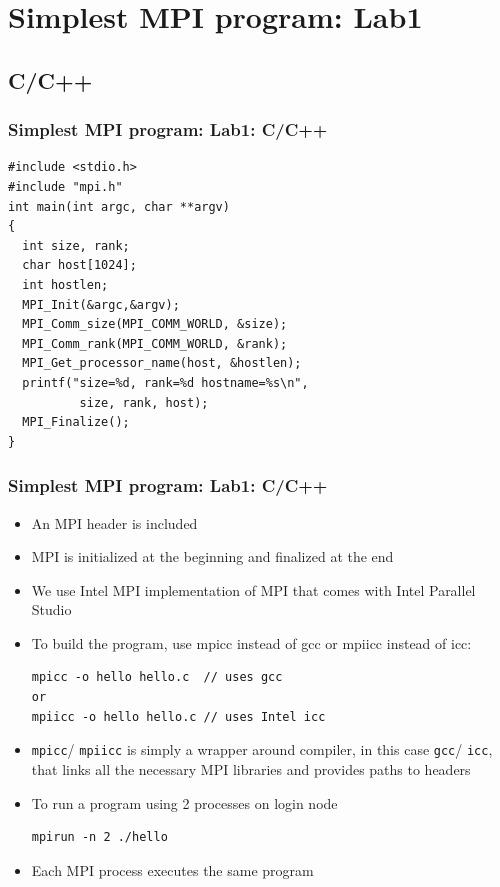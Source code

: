 \documentclass{beamer}
\begin{document}
\section{Simplest MPI program: Lab1}
\subsection{C/C++}
\begin{frame}[fragile]
  \frametitle{Simplest MPI program: Lab1: C/C++}
{\color{mycolorcode}
{\small
\begin{verbatim}
#include <stdio.h>
#include "mpi.h"
int main(int argc, char **argv)
{
  int size, rank;
  char host[1024];
  int hostlen;
  MPI_Init(&argc,&argv);
  MPI_Comm_size(MPI_COMM_WORLD, &size);
  MPI_Comm_rank(MPI_COMM_WORLD, &rank);
  MPI_Get_processor_name(host, &hostlen);
  printf("size=%d, rank=%d hostname=%s\n", 
          size, rank, host);
  MPI_Finalize();
}
\end{verbatim}
}
}
\end{frame}

\begin{frame}[fragile]
  \frametitle{Simplest MPI program: Lab1: C/C++}
\begin{itemize}
\item An MPI header is included
\item MPI is initialized at the beginning and finalized at the end
\item We use \textcolor{mycolordef}{Intel MPI} implementation of MPI that comes with Intel Parallel Studio
\item To build the program, use {\color{mycolorcli}mpicc} instead of {\color{mycolorcli}gcc} or 
  {\color{mycolorcli}mpiicc} instead of {\color{mycolorcli}icc}:
{\color{mycolorcli}
\begin{verbatim}
mpicc -o hello hello.c  // uses gcc
or
mpiicc -o hello hello.c // uses Intel icc
\end{verbatim}
}
\item {\color{mycolorcli} \verb|mpicc|}/{\color{mycolorcli} \verb|mpiicc|} is simply a wrapper around compiler, 
  in this case {\color{mycolorcli} \verb|gcc|}/{\color{mycolorcli} \verb|icc|}, 
  that links all the necessary MPI libraries and provides paths to headers
\item To run a program using 2 processes on login node
{\color{mycolorcli}
\begin{verbatim}
mpirun -n 2 ./hello
\end{verbatim}
}
\item Each MPI process executes the same program
\end{itemize}
\end{frame}
\end{document}
